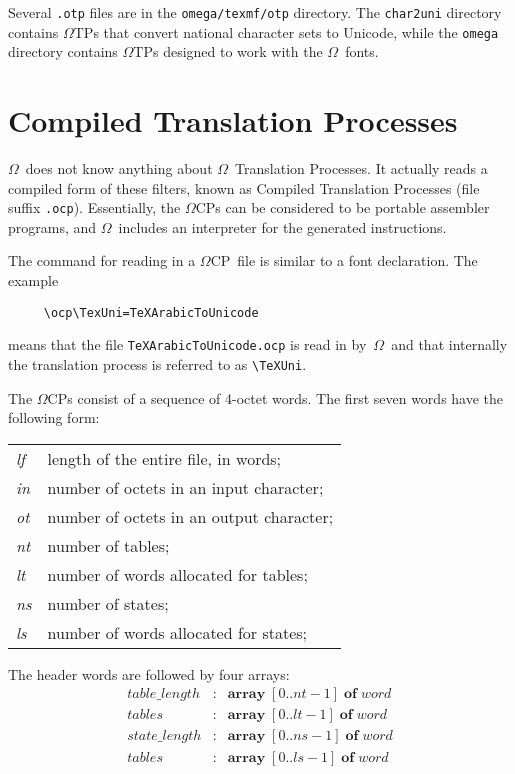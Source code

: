 \documentclass[fleqn]{article}
\newcommand{\OMEGA}{$\Omega$}
\newcommand{\OTP}{\OMEGA TP}
\newcommand{\OCP}{\OMEGA CP}
\begin{document}
Several \texttt{.otp} files are in the
\texttt{omega/texmf/otp} directory.
The \texttt{char2uni} directory contains \OTP s that
convert national character sets to Unicode, while the
\texttt{omega} directory contains \OTP s designed to work
with the \OMEGA\ fonts.

\section{Compiled Translation Processes}

\OMEGA\ does not know anything about \OMEGA\ Translation Processes.
It actually reads a compiled form of these filters, known as
Compiled Translation Processes (file suffix \texttt{.ocp}).
Essentially, the \OCP s can be considered to be portable assembler
programs, and \OMEGA\ includes an interpreter for the generated
instructions.

The command for reading in a \OCP\ file is similar to a font
declaration.  The example
\begin{verbatim}
     \ocp\TexUni=TeXArabicToUnicode
\end{verbatim}
means that the file \verb|TeXArabicToUnicode.ocp| is read 
in by~\OMEGA\ and that internally the translation process is
referred to as \verb|\TeXUni|.

The \OCP s consist of a sequence of 4-octet words.  The first seven
words have the following form:

\begin{tabular}{ll}
\emph{lf}&length of the entire file, in words;\\
\emph{in}&number of octets in an input character;\\
\emph{ot}&number of octets in an output character;\\
\emph{nt}&number of tables;\\
\emph{lt}&number of words allocated for tables;\\
\emph{ns}&number of states;\\
\emph{ls}&number of words allocated for states;\\
\end{tabular}

\noindent
The header words are followed by four arrays:
\begin{eqnarray*}
\mathit{table\_length} & : & 
   \mathbf{array} \; [0..\mathit{nt}-1] \; \mathbf{of} \; \mathit{word}\\
\mathit{tables} & : & 
   \mathbf{array} \; [0..\mathit{lt}-1] \; \mathbf{of} \; \mathit{word}\\
\mathit{state\_length} & : & 
   \mathbf{array} \; [0..\mathit{ns}-1] \; \mathbf{of} \; \mathit{word}\\
\mathit{tables} & : & 
   \mathbf{array} \; [0..\mathit{ls}-1] \; \mathbf{of} \; \mathit{word}
\end{eqnarray*}
\end{document}
